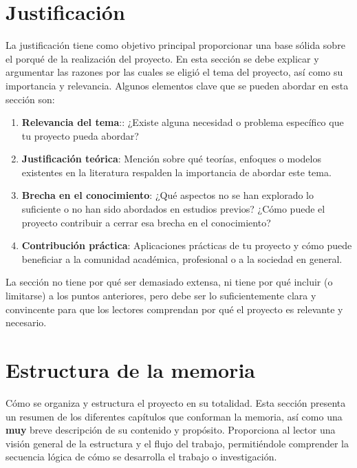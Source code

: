 \section{Justificación}

La justificación tiene como objetivo principal proporcionar una base sólida sobre el porqué de la realización del proyecto. En esta sección se debe explicar y argumentar las razones por las cuales se eligió el tema del proyecto, así como su importancia y relevancia. Algunos elementos clave que se pueden abordar en esta sección son:

\begin{enumerate}
    \item \textbf{Relevancia del tema}:: ¿Existe alguna necesidad o problema específico que tu proyecto pueda abordar?
    \item \textbf{Justificación teórica}: Mención sobre qué teorías, enfoques o modelos existentes en la literatura respalden la importancia de abordar este tema.
    \item \textbf{Brecha en el conocimiento}: ¿Qué aspectos no se han explorado lo suficiente o no han sido abordados en estudios previos? ¿Cómo puede el proyecto contribuir a cerrar esa brecha en el conocimiento?
    \item \textbf{Contribución práctica}: Aplicaciones prácticas de tu proyecto y cómo puede beneficiar a la comunidad académica, profesional o a la sociedad en general.
\end{enumerate}

La sección no tiene por qué ser demasiado extensa, ni tiene por qué incluir (o limitarse) a los puntos anteriores, pero debe ser lo suficientemente clara y convincente para que los lectores comprendan por qué el proyecto es relevante y necesario.

\section{Estructura de la memoria}

Cómo se organiza y estructura el proyecto en su totalidad. Esta sección presenta un resumen de los diferentes capítulos que conforman la memoria, así como una \textbf{muy} breve descripción de su contenido y propósito. Proporciona al lector una visión general de la estructura y el flujo del trabajo, permitiéndole comprender la secuencia lógica de cómo se desarrolla el trabajo o investigación.